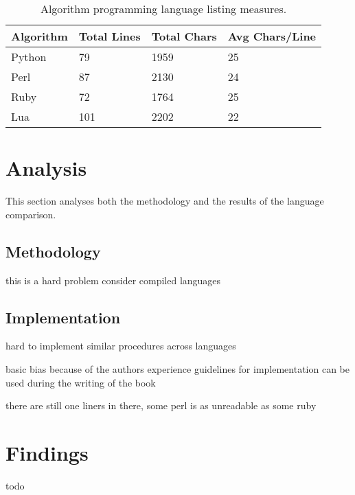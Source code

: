 \documentclass[a4paper, 11pt]{article}
\begin{document}
\begin{table}[ht]
	\centering
		\begin{tabularx}{\textwidth}{lXXX}
		\toprule
		\textbf{Algorithm} & \textbf{Total Lines} & \textbf{Total Chars} & \textbf{Avg Chars/Line} \\ 
		\toprule
		Python & 79 & 1959 & 25 \\
		Perl & 87 & 2130 & 24 \\		
		Ruby & 72 & 1764 & 25 \\
		Lua & 101 & 2202 & 22 \\
		\bottomrule
		\end{tabularx}	
	\caption{Algorithm programming language listing measures.}
	\label{tab:implementation_results}
\end{table}

% 
% 
\section{Analysis}
\label{sec:analysis}
This section analyses both the methodology and the results of the language comparison.

% 
% 
\subsection{Methodology}
this is a hard problem
consider compiled languages

% 
% 
\subsection{Implementation}
hard to implement similar procedures across languages

basic bias because of the authors experience
guidelines for implementation can be used during the writing of the book

there are still one liners in there, some perl is as unreadable as some ruby

% 
% 
\section{Findings}
\label{sec:findings}
todo





\end{document}
